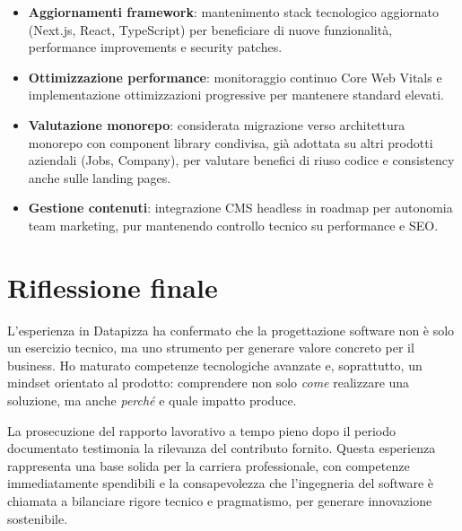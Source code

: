 \begin{itemize}
  \item \textbf{Aggiornamenti framework}: mantenimento stack tecnologico 
        aggiornato (Next.js, React, TypeScript) per beneficiare di nuove 
        funzionalità, performance improvements e security patches.
  
  \item \textbf{Ottimizzazione performance}: monitoraggio continuo Core Web Vitals 
        e implementazione ottimizzazioni progressive per mantenere standard elevati.
  
  \item \textbf{Valutazione monorepo}: considerata migrazione verso architettura 
        monorepo con component library condivisa, già adottata su altri prodotti 
        aziendali (Jobs, Company), per valutare benefici di riuso codice e 
        consistency anche sulle landing pages.
  
  \item \textbf{Gestione contenuti}: integrazione CMS headless in roadmap per 
        autonomia team marketing, pur mantenendo controllo tecnico su 
        performance e SEO.
\end{itemize}

\section{Riflessione finale}
L'esperienza in Datapizza ha confermato che la progettazione software non è solo
un esercizio tecnico, ma uno strumento per generare valore concreto per il business.
Ho maturato competenze tecnologiche avanzate e, soprattutto, un mindset orientato al prodotto:
comprendere non solo \textit{come} realizzare una soluzione, ma anche \textit{perché}
e quale impatto produce.

La prosecuzione del rapporto lavorativo a tempo pieno dopo il periodo documentato
testimonia la rilevanza del contributo fornito. Questa esperienza rappresenta una base solida
per la carriera professionale, con competenze immediatamente spendibili e la consapevolezza
che l'ingegneria del software è chiamata a bilanciare rigore tecnico e pragmatismo,
per generare innovazione sostenibile.